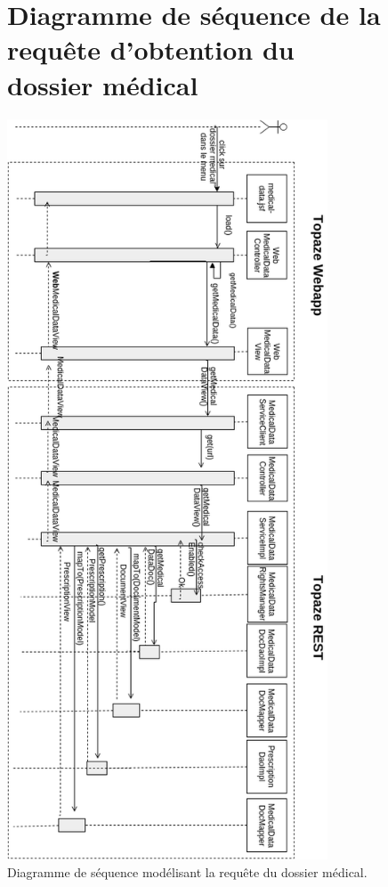 \begin{appendices}
\begin{figure}[H]
\section*{Diagramme de séquence de la requête d'obtention du dossier médical}
  \centering
  \includegraphics[height=22cm]{./img/diag_seq2}
  \caption{\label{fig:diag_seq} Diagramme de séquence modélisant la requête du dossier médical.}
\end{figure}

\newpage
\begin{figure}[H]

\end{figure}
\end{appendices}
